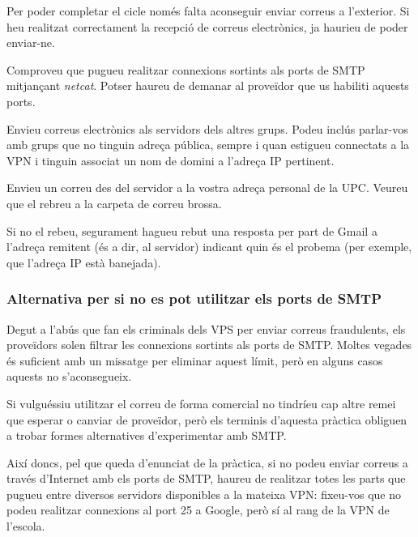 \documentclass{practicaitic}
\begin{document}
Per poder completar el cicle només falta aconseguir enviar correus a l'exterior.
Si heu realitzat correctament la recepció de correus electrònics, ja haurieu
de poder enviar-ne.

\begin{previ}
  Comproveu que pugueu realitzar connexions sortints als ports de SMTP
  mitjançant \textit{netcat}. Potser haureu de demanar al proveïdor que
  us habiliti aquests ports.

\end{previ}

\begin{tasca}
  Envieu correus electrònics als servidors dels altres grups.
  Podeu inclús parlar-vos amb grups
  que no tinguin adreça pública, sempre i quan estigueu connectats
  a la VPN i tinguin associat un nom de domini a l'adreça IP pertinent.
\end{tasca}

\begin{tasca}
  Envieu un correu des del servidor a la vostra adreça personal de la UPC.
  Veureu que el rebreu a la carpeta de correu brossa.
  
  Si no el rebeu, segurament
  hagueu rebut una resposta per part de Gmail a l'adreça remitent (és a dir,
  al servidor) indicant quin és el probema (per exemple, que l'adreça IP està
  banejada). %
\end{tasca}

\subsubsection{Alternativa per si no es pot utilitzar els ports de SMTP}
\label{sec:plan-b}

Degut a l'abús que fan els criminals dels VPS per enviar correus
fraudulents, els proveïdors solen filtrar les connexions sortints
als ports de SMTP. Moltes vegades és suficient amb un missatge per
eliminar aquest límit, però en alguns casos aquests no s'aconsegueix.

Si vulguéssiu utilitzar el correu de forma comercial no tindríeu cap
altre remei que esperar o canviar de proveïdor, però els terminis
d'aquesta pràctica obliguen a trobar formes alternatives d'experimentar
amb SMTP.

Així doncs, pel que queda d'enunciat de la pràctica, si no podeu
enviar correus a través d'Internet amb els ports de SMTP, haureu de realitzar
totes les parts que pugueu entre diversos servidors disponibles a la mateixa
VPN: fixeu-vos que no podeu realitzar connexions al port 25 a Google, però sí
al rang de la VPN de l'escola.
\end{document}
